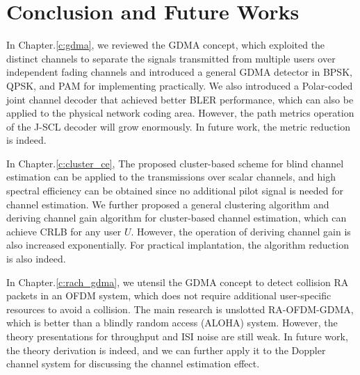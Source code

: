 \chapter{Conclusion and Future Works}
\label{c:remarks}


In Chapter.\ref{c:gdma}, we reviewed the GDMA concept, which exploited the distinct channels to separate the signals transmitted from multiple users over independent fading channels and introduced a general GDMA detector in BPSK, QPSK, and PAM for implementing practically.   We also introduced a Polar-coded joint channel decoder that achieved better BLER performance, which can also be applied to the physical network coding area. However, the path metrics operation of the J-SCL decoder will grow enormously. In future work, the metric reduction is indeed.

In Chapter.\ref{c:cluster_ce}, The proposed cluster-based scheme for blind channel estimation can be applied to the transmissions over scalar channels, and high spectral efficiency can be obtained since no additional pilot signal is needed for channel estimation. We further proposed a general clustering algorithm and deriving channel gain algorithm for cluster-based channel estimation, which can achieve CRLB for any user $U$. However, the operation of deriving channel gain is also increased exponentially. For practical implantation, the algorithm reduction is also indeed.

In Chapter.\ref{c:rach_gdma}, we utensil the GDMA concept to detect collision RA packets in an OFDM system, which does not require additional user-specific resources to avoid a collision. The main research is unslotted RA-OFDM-GDMA, which is better than a blindly random access (ALOHA) system. However, the theory presentations for throughput and ISI noise are still weak. In future work, the theory derivation is indeed, and we can further apply it to the Doppler channel system for discussing the channel estimation effect.  

